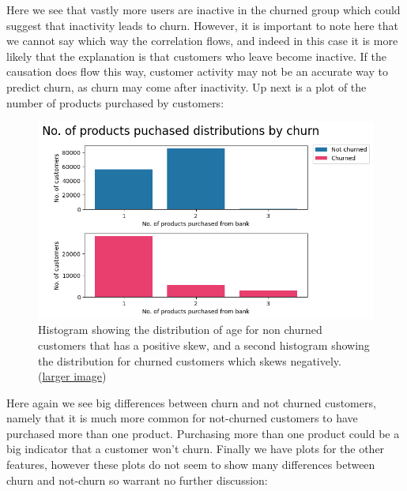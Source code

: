 \documentclass[]{article}
\begin{document}
Here we see that vastly more users are inactive in the churned group which could suggest that inactivity leads to churn. However, it is important to note here that we cannot say which way the correlation flows, and indeed in this case it is more likely that the explanation is that customers who leave become inactive. If the causation does flow this way, customer activity may not be an accurate way to predict churn, as churn may come after inactivity. Up next is a plot of the number of products purchased by customers:

\begin{figure}[h!]
	\centering
	\includegraphics[scale=0.5]{products_by_churn}
	\caption{Histogram showing the distribution of age for non churned customers that has a positive skew, and a second histogram showing the distribution for churned customers which skews negatively. (\href{https://github.com/ray33ee/Understanding-predicting-and-preventing-churn/blob/main/tex/products_by_churn.png?raw=true}{larger image})}
\end{figure}

Here again we see big differences between churn and not churned customers, namely that it is much more common for not-churned customers to have purchased more than one product. Purchasing more than one product could be a big indicator that a customer won’t churn. Finally we have plots for the other features, however these plots do not seem to show many differences between churn and not-churn so warrant no further discussion:
\clearpage
\end{document}
